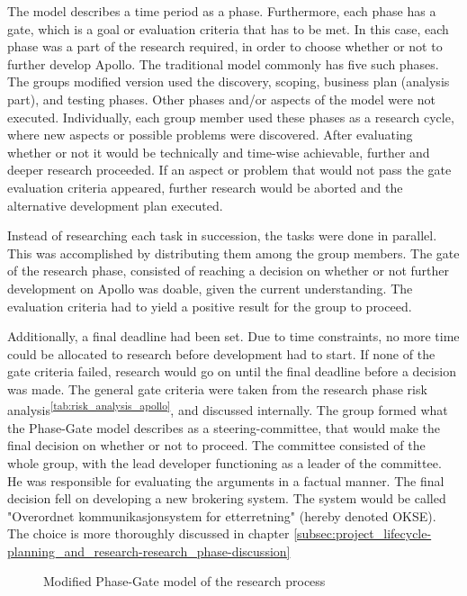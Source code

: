 The model describes a time period as a phase. Furthermore, each phase has a gate, which is a goal or evaluation criteria that has to be met. In this case, each phase was a part of the research required, in order to choose whether or not to further develop Apollo. The traditional model commonly has five such phases. The groups modified version used the discovery, scoping, business plan (analysis part), and testing phases. Other phases and/or aspects of the model were not executed. Individually, each group member used these phases as a research cycle, where new aspects or possible problems were discovered. After evaluating whether or not it would be technically and time-wise achievable, further and deeper research proceeded. If an aspect or problem that would not pass the gate evaluation criteria appeared, further research would be aborted and the alternative development plan executed.

Instead of researching each task in succession, the tasks were done in parallel. This was accomplished by distributing them among the group members. The gate of the research phase, consisted of reaching a decision on whether or not further development on Apollo was doable, given the current understanding. The evaluation criteria had to yield a positive result for the group to proceed.

Additionally, a final deadline had been set. Due to time constraints, no more time could be allocated to research before development had to start. If none of the gate criteria failed, research would go on until the final deadline before a decision was made. The general gate criteria were taken from the research phase risk analysis\textsuperscript{\ref{tab:risk_analysis_apollo}}, and discussed internally. The group formed what the Phase-Gate model describes as a steering-committee, that would make the final decision on whether or not to proceed. The committee consisted of the whole group, with the lead developer functioning as a leader of the committee. He was responsible for evaluating the arguments in a factual manner. The final decision fell on developing a new brokering system. The system would be called "Overordnet kommunikasjonsystem for etterretning" (hereby denoted OKSE). The choice is more thoroughly discussed in chapter \ref{subsec:project_lifecycle-planning_and_research-research_phase-discussion}

\begin{center}
  \begin{figure}[ht!]
    \caption{Modified Phase-Gate model of the research process}
    \label{fig:phasegate}
  \end{figure}
\end{center}

